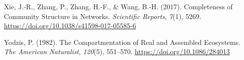 \documentclass[
]{article}
\newlength{\cslhangindent}
\newenvironment{CSLReferences}[2] %
 {\begin{list}{}{%
  \setlength{\itemindent}{0pt}
  \setlength{\leftmargin}{0pt}
  \setlength{\parsep}{0pt}
  \ifodd #1
   \setlength{\leftmargin}{\cslhangindent}
   \setlength{\itemindent}{-1\cslhangindent}
  \fi
  \setlength{\itemsep}{#2\baselineskip}}}
 {\end{list}}
\begin{document}
\begin{CSLReferences}{1}{0}
Xie, J.-R., Zhang, P., Zhang, H.-F., \& Wang, B.-H. (2017). Completeness
of {Community Structure} in {Networks}. \emph{Scientific Reports},
\emph{7}(1), 5269. \url{https://doi.org/10.1038/s41598-017-05585-6}

Yodzis, P. (1982). The {Compartmentation} of {Real} and {Assembled
Ecosystems}. \emph{The American Naturalist}, \emph{120}(5), 551--570.
\url{https://doi.org/10.1086/284013}

\end{CSLReferences}
\end{document}
